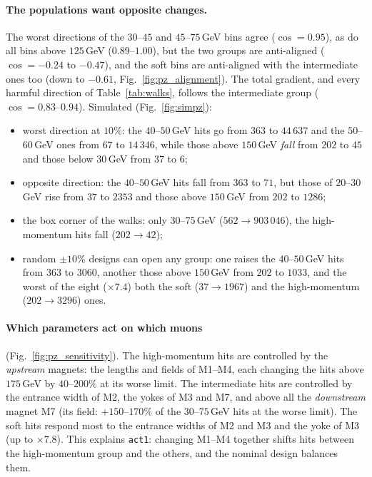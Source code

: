 \documentclass[11pt,a4paper]{article}
\begin{document}
\paragraph{The populations want opposite changes.}
The worst directions of the $30$--$45$ and $45$--$75$\,GeV bins agree ($\cos=0.95$), as do all
bins above $125$\,GeV ($0.89$--$1.00$), but the two groups are anti-aligned ($\cos=-0.24$ to
$-0.47$), and the soft bins are anti-aligned with the intermediate ones too (down to $-0.61$,
Fig.~\ref{fig:pz_alignment}). The total gradient, and every harmful direction of
Table~\ref{tab:walks}, follows the intermediate group ($\cos=0.83$--$0.94$). Simulated
(Fig.~\ref{fig:simpz}):
\begin{itemize}
  \item worst direction at $10\%$: the $40$--$50$\,GeV hits go from $363$ to $44\,637$ and the
        $50$--$60$\,GeV ones from $67$ to $14\,346$, while those above $150$\,GeV \emph{fall}
        from $202$ to $45$ and those below $30$\,GeV from $37$ to $6$;
  \item opposite direction: the $40$--$50$\,GeV hits fall from $363$ to $71$, but those of
        $20$--$30$\,GeV rise from $37$ to $2353$ and those above $150$\,GeV from $202$ to $1286$;
  \item the box corner of the walks: only $30$--$75$\,GeV ($562\to903\,046$), the high-momentum
        hits fall ($202\to42$);
  \item random $\pm10\%$ designs can open any group: one raises the $40$--$50$\,GeV hits from $363$
        to $3060$, another those above $150$\,GeV from $202$ to $1033$, and the worst of the eight
        ($\times7.4$) both the soft ($37\to1967$) and the high-momentum ($202\to3296$) ones.
\end{itemize}

\paragraph{Which parameters act on which muons} (Fig.~\ref{fig:pz_sensitivity}).
The high-momentum hits are controlled by the \emph{upstream} magnets: the lengths and fields of
M1--M4, each changing the hits above $175$\,GeV by $40$--$200\%$ at its worse limit. The
intermediate hits are controlled by the entrance width of M2, the yokes of M3 and M7, and above
all the \emph{downstream} magnet M7 (its field: $+150$--$170\%$ of the $30$--$75$\,GeV hits at the
worse limit). The soft hits respond most to the entrance widths of M2 and M3 and the yoke of M3
(up to $\times7.8$). This explains \texttt{act1}: changing M1--M4 together shifts hits between the
high-momentum group and the others, and the nominal design balances them.
\end{document}
